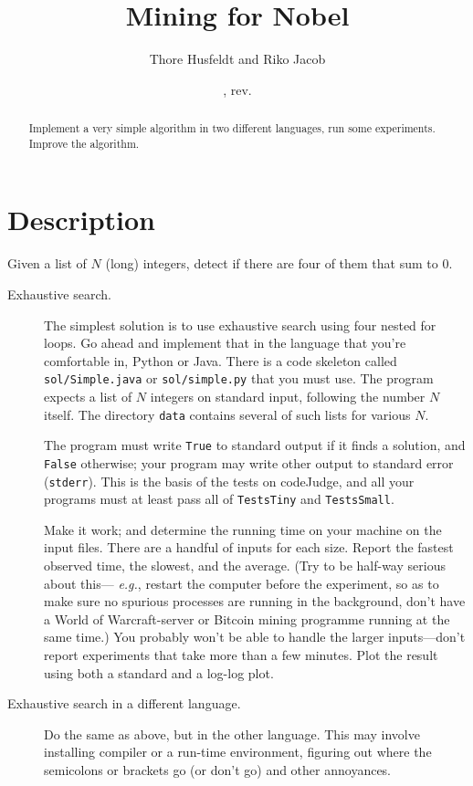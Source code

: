 \documentclass{tufte-handout}
\title{Mining for Nobel}
\author{Thore Husfeldt and Riko Jacob}
\date{\GITAuthorDate, rev. \GITAbrHash}
\begin{document}
\maketitle
\begin{abstract}
  Implement a very simple algorithm in two different languages, run some experiments.
  Improve the algorithm.
\end{abstract}


 \section{Description}

 Given a list of $N$ (long) integers, detect if there are four of them that sum to $0$.

\begin{description}
  \item[Exhaustive search.]
The simplest solution is to use exhaustive search using four nested for loops.
Go ahead and implement that in the language that you’re comfortable in, Python or Java.
There is a code skeleton called \texttt{sol/Simple.java} or \texttt{sol/simple.py} that you must use.
The program expects a list of $N$ integers on standard input, following the number $N$ itself.
The directory \texttt{data} contains several of such lists for various $N$.

The program must write \texttt{True} to standard output if it finds a solution, and \texttt{False} otherwise;
your program may write other output to standard error (\texttt{stderr}).
This is the basis of the tests on codeJudge, and all your programs must at least pass all of \texttt{TestsTiny} and \texttt{TestsSmall}.

Make it work; and determine the running time on your machine on the input files. 
There are a handful of inputs for each size.
Report the fastest observed time, the slowest, and the average.
(Try to be half-way serious about this--- \emph{e.g.}, restart the computer before the experiment, so as to make sure no spurious processes are running in the background, don’t have a World of Warcraft-server or Bitcoin mining programme running at the same time.)
You probably won’t be able to handle the larger inputs---don’t report experiments that take more than a few minutes.
Plot the result using both a standard and a log-log plot.

\item[Exhaustive search in a different language.]
  Do the same as above, but in the other language.
  This may involve installing compiler or a run-time environment, figuring out where the semicolons or brackets go (or don’t go) and other annoyances.


\end{description}
\end{document}
